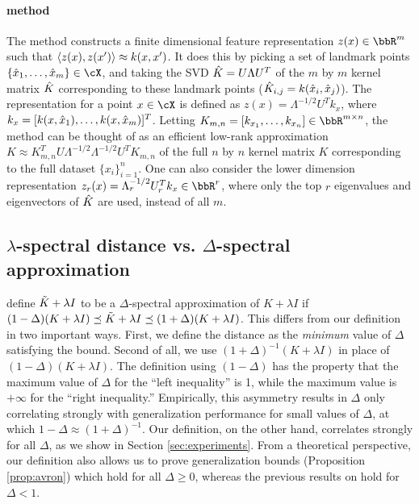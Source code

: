 \paragraph{\Nystrom method}
The \Nystrom method constructs a finite dimensional feature representation
$z(x) \in \RR^m$ such that $\left\langle z(x),z(x')\right\rangle \approx k(x,x')$.  It does this
by picking a set of landmark points $\{\hx_1,\ldots,\hx_m\} \in \cX$,
and taking the SVD $\hat{K} = U\Lambda U^T$ of the $m$ by $m$ 
kernel matrix $\hat{K}$ corresponding to these landmark points 
($\hat{K}_{i,j} = k(\hat{x}_i,\hat{x}_j)$).  The \Nystrom representation for a point $x \in \cX$
is defined as $z(x) = \Lambda^{-1/2} U^T k_x$, where $k_x = [k(x,\hat{x}_1),\ldots,k(x,\hat{x}_m)]^T$.
Letting $K_{m,n} = [k_{x_1},\ldots,k_{x_n}] \in \RR^{m\times n}$, 
the \Nystrom method can be thought of as an efficient low-rank approximation
$K \approx K_{m,n}^T U \Lambda^{-1/2}\Lambda^{-1/2} U^T K_{m,n}$ of the full
$n$ by $n$ kernel matrix $K$ corresponding to the full dataset $\{x_i\}_{i=1}^n$.
One can also consider the lower dimension \Nystrom representation
$z_r(x) = \Lambda_r^{-1/2} U_r^T k_x \in \RR^r$, where only the top $r$ eigenvalues and
eigenvectors of $\hat{K}$ are used, instead of all $m$.


\subsection{$\lambda$-spectral distance vs. $\Delta$-spectral approximation}
\citet{avron17} define $\tilde{K}+\lambda I$ to be a $\Delta$-spectral approximation of $K+\lambda I$ if $(1-\Delta)(K+\lambda I) \preceq \tilde{K} + \lambda I \preceq (1+\Delta)(K+\lambda I)$. This differs from our definition in two important ways. First, we define the distance as the \textit{minimum} value of $\Delta$ satisfying the bound.  Second of all, we use $(1+\Delta)^{-1}(K+\lambda I)$ in place of $(1-\Delta)(K+\lambda I)$. The definition using $(1-\Delta)$ has the property that the maximum value of $\Delta$ for the ``left inequality'' is 1, while the maximum value is $+\infty$ for the ``right inequality.'' Empirically, this asymmetry results in $\Delta$ only correlating strongly with generalization performance for small values of $\Delta$, at which $1-\Delta\approx (1+\Delta)^{-1}$. Our definition, on the other hand, correlates strongly for all $\Delta$, as we show in Section \ref{sec:experiments}.  From a theoretical perspective, our definition also allows us to prove generalization bounds (Proposition \ref{prop:avron}) which hold for all $\Delta \geq 0$, whereas the previous results on hold for $\Delta < 1$.